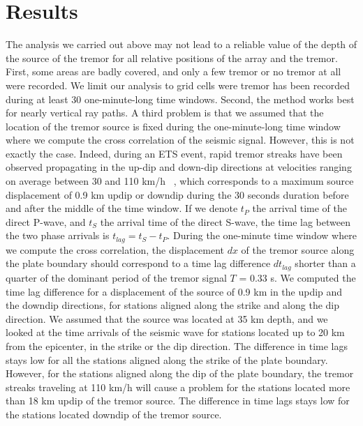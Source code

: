 \documentclass[draft]{agujournal2019}
\begin{document}

\section{Results}

The analysis we carried out above may not lead to a reliable value of the depth of the source of the tremor for all relative positions of the array and the tremor. First, some areas are badly covered, and only a few tremor or no tremor at all were recorded. We limit our analysis to grid cells were tremor has been recorded during at least 30 one-minute-long time windows. Second, the method works best for nearly vertical ray paths. A third problem is that we assumed that the location of the tremor source is fixed during the one-minute-long time window where we compute the cross correlation of the seismic signal. However, this is not exactly the case. Indeed, during an ETS event, rapid tremor streaks have been observed propagating in the up-dip and down-dip directions at velocities ranging on average between 30 and 110 km/h ~\cite{GHO_2010_G3}, which corresponds to a maximum source displacement of 0.9 km updip or downdip during the 30 seconds duration before and after the middle of the time window. If we denote $t_P$ the arrival time of the direct P-wave, and $t_S$ the arrival time of the direct S-wave, the time lag between the two phase arrivals is $t_{lag} = t_S - t_P$. During the one-minute time window where we compute the cross correlation, the displacement $dx$ of the tremor source along the plate boundary should correspond to a time lag difference $dt_{lag}$ shorter than a quarter of the dominant period of the tremor signal $T$ = 0.33 s. We computed the time lag difference for a displacement of the source of 0.9 km in the updip and the downdip directions, for stations aligned along the strike and along the dip direction. We assumed that the source was located at 35 km depth, and we looked at the time arrivals of the seismic wave for stations located up to 20 km from the epicenter, in the strike or the dip direction. The difference in time lags stays low for all the stations aligned along the strike of the plate boundary. However, for the stations aligned along the dip of the plate boundary, the tremor streaks traveling at 110 km/h will cause a problem for the stations located more than 18 km updip of the tremor source. The difference in time lags stays low for the stations located downdip of the tremor source. \\
\end{document}
